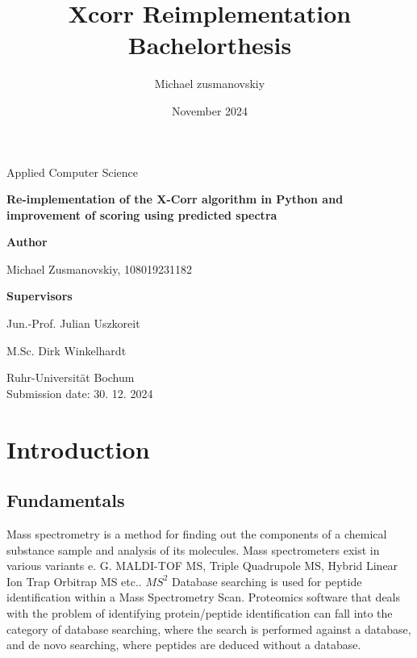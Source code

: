 \documentclass[12pt]{article}
\title{Xcorr Reimplementation Bachelorthesis}
\author{Michael zusmanovskiy}
\date{November 2024}
\begin{document}
\begin{titlepage}
    \begin{center}
        \LARGE
        Applied Computer Science

        \vspace{1.5cm}
            
        \LARGE
        \textbf{Re-implementation of the X-Corr algorithm in Python and improvement of scoring using predicted spectra}
            
        \vspace{1.5cm}

        \LARGE
        \textbf{Author}
        
        Michael Zusmanovskiy, 108019231182
        
        \vspace{1.5cm}
        
        \LARGE
        \textbf{Supervisors}
        
        Jun.-Prof. Julian Uszkoreit
        
        M.Sc. Dirk Winkelhardt
            
        \vfill
            

        \vspace{0.8cm}

        \Large
        Ruhr-Universität Bochum\\
        
        Submission date: 30. 12. 2024
            
    \end{center}
\end{titlepage}


\section{Introduction}
\subsection{Fundamentals}
Mass spectrometry is a method for finding out the components of a chemical substance sample and analysis of its molecules. Mass spectrometers exist in various variants e. G. MALDI-TOF MS, Triple Quadrupole MS, Hybrid Linear Ion Trap Orbitrap MS etc..
\(MS^2\) Database searching is used for peptide identification within a Mass Spectrometry Scan. Proteomics software
that deals with the problem of identifying protein/peptide identification can fall into the category of database searching,
where the search is performed against a database, and de novo searching, where peptides are deduced without a database.
\end{document}
